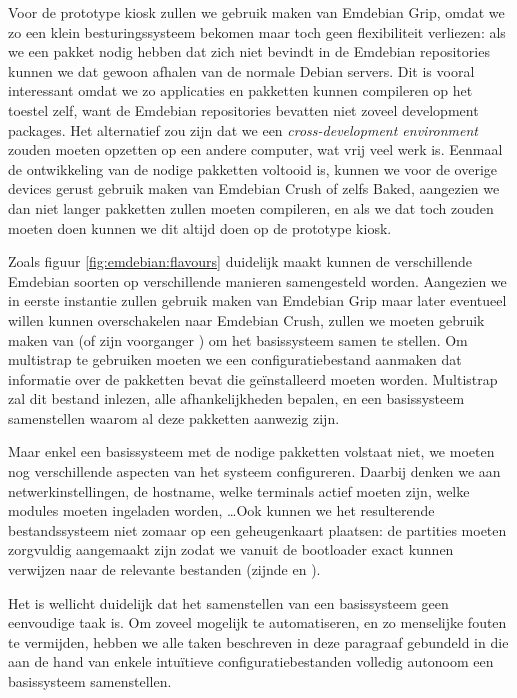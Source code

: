 Voor de prototype kiosk zullen we gebruik maken van Emdebian Grip, omdat we zo een klein besturingssysteem bekomen maar toch geen flexibiliteit verliezen: als we een pakket nodig hebben dat zich niet bevindt in de Emdebian repositories kunnen we dat gewoon afhalen van de normale Debian servers. Dit is vooral interessant omdat we zo applicaties en pakketten kunnen compileren op het toestel zelf, want de Emdebian repositories bevatten niet zoveel development packages. Het alternatief zou zijn dat we een \emph{cross-development environment} zouden moeten opzetten op een andere computer, wat vrij veel werk is.
Eenmaal de ontwikkeling van de nodige pakketten voltooid is, kunnen we voor de overige devices gerust gebruik maken van Emdebian Crush of zelfs Baked, aangezien we dan niet langer pakketten zullen moeten compileren, en als we dat toch zouden moeten doen kunnen we dit altijd doen op de prototype kiosk.

Zoals figuur \ref{fig:emdebian:flavours} duidelijk maakt kunnen de verschillende Emdebian soorten op verschillende manieren samengesteld worden. Aangezien we in eerste instantie zullen gebruik maken van Emdebian Grip maar later eventueel willen kunnen overschakelen naar Emdebian Crush, zullen we moeten gebruik maken van  (of zijn voorganger ) om het basissysteem samen te stellen. Om multistrap te gebruiken moeten we een configuratiebestand aanmaken dat informatie over de pakketten bevat die geïnstalleerd moeten worden. Multistrap zal dit bestand inlezen, alle afhankelijkheden bepalen, en een basissysteem samenstellen waarom al deze pakketten aanwezig zijn.

Maar enkel een basissysteem met de nodige pakketten volstaat niet, we moeten nog verschillende aspecten van het systeem configureren. Daarbij denken we aan netwerkinstellingen, de hostname, welke terminals actief moeten zijn, welke modules moeten ingeladen worden, \ldots Ook kunnen we het resulterende bestandssysteem niet zomaar op een geheugenkaart plaatsen: de partities moeten zorgvuldig aangemaakt zijn zodat we vanuit de bootloader exact kunnen verwijzen naar de relevante bestanden (zijnde  en ).

Het is wellicht duidelijk dat het samenstellen van een basissysteem geen eenvoudige taak is. Om zoveel mogelijk te automatiseren, en zo menselijke fouten te vermijden, hebben we alle taken beschreven in deze paragraaf gebundeld in  die aan de hand van enkele intuïtieve configuratiebestanden volledig autonoom een basissysteem samenstellen.


